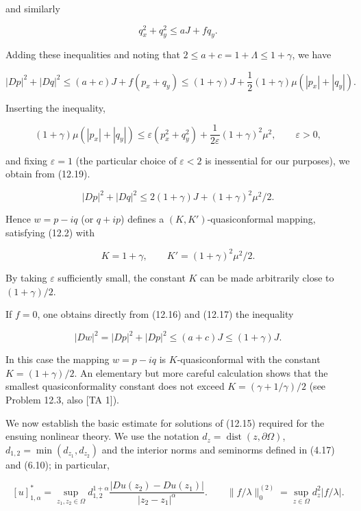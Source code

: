 and similarly

\[
q_x^2+q_y^2\le aJ+fq_y.
\]

Adding these inequalities and noting that $2\le a+c=1+\Lambda\le 1+\gamma$, we have

\begin{equation}\tag{12.19}
|Dp|^2+|Dq|^2\le (a+c)J+f(p_x+q_y)
\le (1+\gamma)J+\frac12(1+\gamma)\mu(|p_x|+|q_y|).
\end{equation}

Inserting the inequality,

\[
(1+\gamma)\mu(|p_x|+|q_y|)\le \varepsilon(p_x^2+q_y^2)+\frac{1}{2\varepsilon}(1+\gamma)^2\mu^2,\qquad \varepsilon>0,
\]

and fixing $\varepsilon=1$ (the particular choice of $\varepsilon<2$ is inessential for our purposes),
we obtain from (12.19).

\begin{equation}\tag{12.20}
|Dp|^2+|Dq|^2\le 2(1+\gamma)J+(1+\gamma)^2\mu^2/2.
\end{equation}


Hence $w=p-iq$ (or $q+ip$) defines a $(K, K')$-quasiconformal mapping, satisfying
(12.2) with

\begin{equation}
\tag{12.21}
K = 1+\gamma, \qquad K' = (1+\gamma)^2\mu^2/2.
\end{equation}

By taking $\varepsilon$ sufficiently small, the constant $K$ can be made arbitrarily close to
$(1+\gamma)/2$.

If $f=0$, one obtains directly from (12.16) and (12.17) the inequality

$$
|Dw|^2 = |Dp|^2 + |Dp|^2 \le (a+c)J \le (1+\gamma)J.
$$

In this case the mapping $w=p-iq$ is $K$-quasiconformal with the constant
$K=(1+\gamma)/2$. An elementary but more careful calculation shows that the smallest
quasiconformality constant does not exceed $K=(\gamma+1/\gamma)/2$ (see Problem 12.3,
also [TA 1]).

We now establish the basic estimate for solutions of (12.15) required for the
ensuing nonlinear theory. We use the notation $d_z=\operatorname{dist}(z,\partial\Omega)$, $d_{1,2}=\min(d_{z_1},d_{z_2})$
and the interior norms and seminorms defined in (4.17) and (6.10); in particular,

$$
[u]_{1,\alpha}^*=\sup_{z_1,z_2\in\Omega} d_{1,2}^{1+\alpha}\frac{|Du(z_2)-Du(z_1)|}{|z_2-z_1|^\alpha}.
\qquad
\|f/\lambda\|_0^{(2)}=\sup_{z\in\Omega} d_z^2|f/\lambda|.
$$

